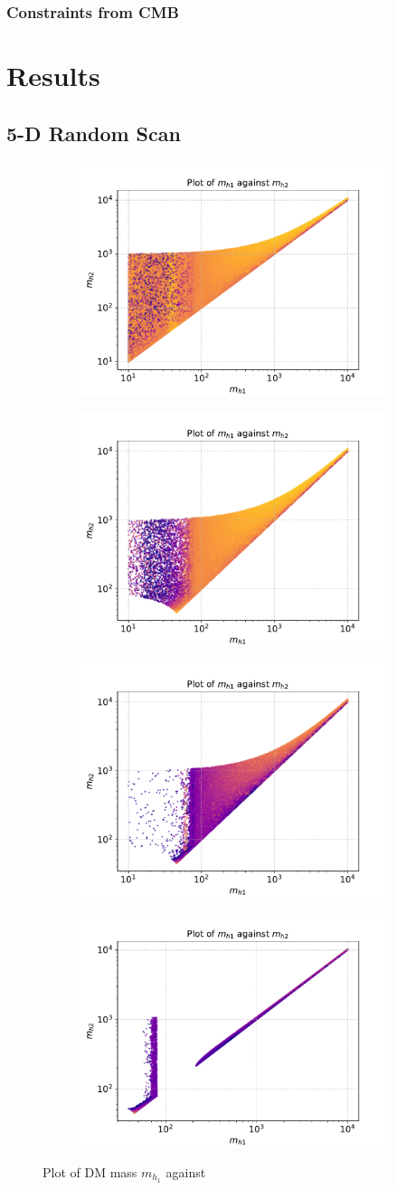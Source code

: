 \documentclass[12pt]{article}
\begin{document}
\subsubsection{Constraints from CMB}

\section{Results}
\label{sec:results}
\subsection{5-D Random Scan}
\label{5-D scan}
\newpage
\onecolumn
\begin{figure}[H]
\begin{subfigure}{.5\textwidth}
  \centering
  \includegraphics[width=0.3\columnwidth]{plots/MD1_MD2_cut1.pdf}
\end{subfigure}%
\begin{subfigure}{.5\textwidth}
  \centering
  \includegraphics[width=0.3\columnwidth]{plots/MD1_MD2_cut1cut2.pdf}
\end{subfigure}
\begin{subfigure}{.5\textwidth}
  \centering
  \includegraphics[width=0.3\columnwidth]{plots/MD1_MD2_cut1cut2cut3.pdf}
\end{subfigure}
\begin{subfigure}{.5\textwidth}
  \centering
  \includegraphics[width=0.3\columnwidth]{plots/MD1_MD2_cut1cut2cut3cut4.pdf}
\end{subfigure}
\caption{Plot of DM mass $m_{h_1}$ against }
\label{fig:input noise}
\end{figure}

\twocolumn
\end{document}
